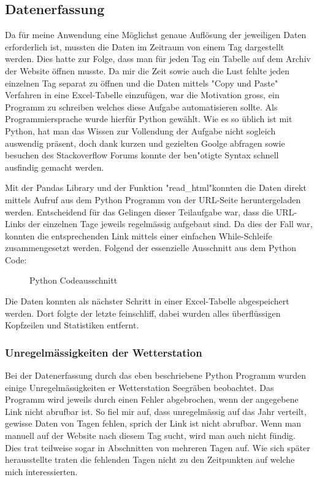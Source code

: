 \begin{refsection}
\subsection{Datenerfassung}
Da f\"ur meine Anwendung eine M\"oglichst genaue Aufl\"osung der jeweiligen Daten erforderlich ist, mussten die Daten im Zeitraum von einem Tag dargestellt werden. 
Dies hatte zur Folge, dass man f\"ur jeden Tag ein Tabelle auf dem Archiv der Website \"offnen musste. 
Da mir die Zeit sowie auch die Lust fehlte jeden einzelnen Tag separat zu \"offnen und die Daten mittels "Copy und Paste" Verfahren in eine Excel-Tabelle einzuf\"ugen, war die Motivation gross, ein Programm zu schreiben welches diese Aufgabe automatisieren sollte.
Als Programmiersprache wurde hierf\"ur Python gewählt.
Wie es so üblich ist mit Python, hat man das Wissen zur Vollendung der Aufgabe nicht sogleich auswendig präsent, doch dank kurzen und gezielten Goolge abfragen sowie besuchen des Stackoverflow Forums konnte der ben"otigte Syntax schnell ausfindig gemacht werden.


Mit der Pandas Library und der Funktion "read\_html"\space konnten die Daten direkt mittels Aufruf aus dem Python Programm von der URL-Seite heruntergeladen werden.
Entscheidend für das Gelingen dieser Teilaufgabe war, dass die URL-Links der einzelnen Tage jeweils regelmässig aufgebaut sind.
Da dies der Fall war, konnten die entsprechenden Link mittels einer einfachen While-Schleife zusammengesetzt werden.
\newpage
Folgend der essenzielle Ausschnitt aus dem Python Code:
\begin{figure}[h]
	\centering
	
	\caption{Python Codeausschnitt}
	\label{fig:python-code}
\end{figure}

Die Daten konnten als nächster Schritt in einer Excel-Tabelle abgespeichert werden.
Dort folgte der letzte feinschliff, dabei wurden alles überflüssigen Kopfzeilen und Statistiken entfernt.

\subsubsection{Unregelmässigkeiten der Wetterstation}
Bei der Datenerfassung durch das eben beschriebene Python Programm wurden einige Unregelmässigkeiten er Wetterstation Seegräben beobachtet.
Das Programm wird jeweils durch einen Fehler abgebrochen, wenn der angegebene Link nicht abrufbar ist. 
So fiel mir auf, dass unregelmässig auf das Jahr verteilt, gewisse Daten von Tagen fehlen, sprich der Link ist nicht abrufbar.
Wenn man manuell auf der Website nach diesem Tag sucht, wird man auch nicht fündig.
Dies trat teilweise sogar in Abschnitten von mehreren Tagen auf.
Wie sich später herausstellte traten die fehlenden Tagen nicht zu den Zeitpunkten auf welche mich interessierten.


\end{refsection}
